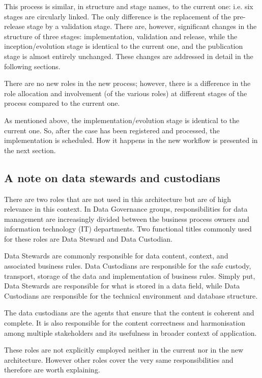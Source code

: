 	This process is similar, in structure and stage names, to the current one: i.e. six stages are circularly linked. The only difference is the replacement of the pre-release stage by a validation stage. There are, however, significant changes in the structure of three stages: implementation, validation and release, while the inception/evolution stage is identical to the current one, and the publication stage is almost entirely unchanged. These changes are addressed in detail in the following sections.
		
	There are no new roles in the new process; however, there is a difference in the role allocation and involvement (of the various roles) at different stages of the process compared to the current one. 
	
	As mentioned above, the implementation/evolution stage is identical to the current one. So, after the case has been registered and processed, the implementation is scheduled. How it happens in the new workflow is presented in the next section. 

    \subsection{A note on data stewards and custodians}
    There are two roles that are not used in this architecture but are of high relevance in this context. In Data Governance groups, responsibilities for data management are increasingly divided between the business process owners and information technology (IT) departments. Two functional titles commonly used for these roles are Data Steward and Data Custodian.
     
     Data Stewards are commonly responsible for data content, context, and associated business rules. Data Custodians are responsible for the safe custody, transport, storage of the data and implementation of business rules. Simply put, Data Stewards are responsible for what is stored in a data field, while Data Custodians are responsible for the technical environment and database structure.
     
     The data custodians are the agents that ensure that the content is coherent and complete. It is also responsible for the content correctness and harmonisation among multiple stakeholders and its usefulness in broader context of application. 
     
     These roles are not explicitly employed neither in the current nor in the new architecture. However other roles cover the very same responsibilities and therefore are worth explaining.  
     
